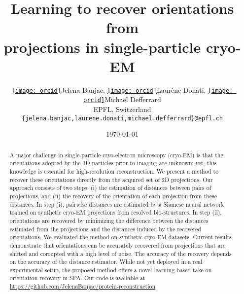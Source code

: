 \documentclass{article}
\author{
    \href{https://orcid.org/0000-0001-7373-4150}{\texttt{[image: orcid]}\hspace{1mm}}Jelena Banjac,
    \href{https://orcid.org/0000-0001-9834-7755}{\texttt{[image: orcid]}\hspace{1mm}}Laurène Donati,
    \href{https://orcid.org/0000-0002-6028-9024}{\texttt{[image: orcid]}\hspace{1mm}}Michaël Defferrard \\
    EPFL, Switzerland \\
    \texttt{\{jelena.banjac,laurene.donati,michael.defferrard\}@epfl.ch}
}
\date{\today}
\title{Learning to recover orientations from\\projections in single-particle cryo-EM}
\begin{document}
\maketitle

\begin{abstract}
    A major challenge in single-particle cryo-electron microscopy (cryo-EM) is that the orientations adopted by the 3D particles prior to imaging are unknown; yet, this knowledge is essential for high-resolution reconstruction.
    We present a method to recover these orientations directly from the acquired set of 2D projections.
    Our approach consists of two steps: (i) the estimation of distances between pairs of projections, and (ii) the recovery of the orientation of each projection from these distances.
    In step (i), pairwise distances are estimated by a Siamese neural network trained on synthetic cryo-EM projections from resolved bio-structures.
    In step (ii), orientations are recovered by minimizing the difference between the distances estimated from the projections and the distances induced by the recovered orientations.
    We evaluated the method on synthetic cryo-EM datasets.
    Current results demonstrate that orientations can be accurately recovered from projections that are shifted and corrupted with a high level of noise.
    The accuracy of the recovery depends on the accuracy of the distance estimator.
    While not yet deployed in a real experimental setup, the proposed method offers a novel learning-based take on orientation recovery in SPA.
    Our code is available at \url{https://github.com/JelenaBanjac/protein-reconstruction}.
\end{abstract}

%










\appendix

\end{document}
